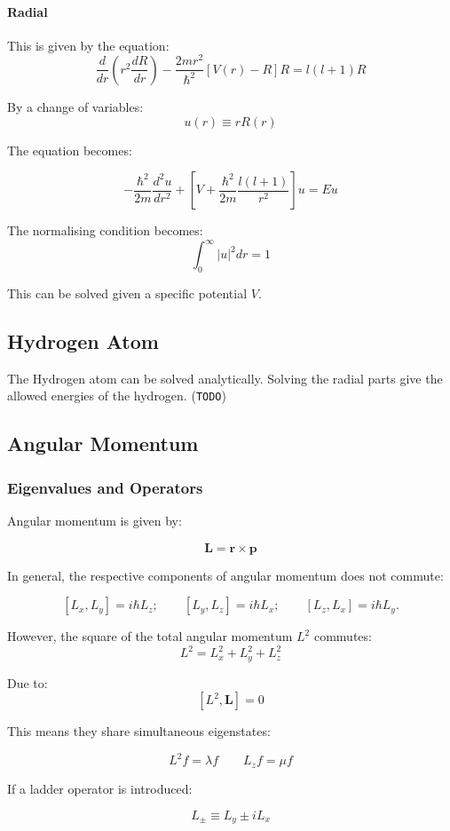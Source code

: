 \documentclass[12pt]{article}
\begin{document}
\paragraph{Radial}

This is given by the equation:
\[\frac{d}{dr}(r^2\frac{dR}{dr}) - \frac{2mr^2}{\hbar^2}[V(r)-R]R = l(l+1)R\]

By a change of variables: 
\[u(r) \equiv rR(r)\]

The equation becomes:

\[-\frac{\hbar^2}{2m}\frac{d^2u}{dr^2} + \left[V + \frac{\hbar^2}{2m}\frac{l(l+1)}{r^2}\right]u=Eu\]

The normalising condition becomes: 
\[\int_0^\infty|u|^2dr = 1\]

This can be solved given a specific potential $V$.

\subsection{Hydrogen Atom}

The Hydrogen atom can be solved analytically. Solving the radial parts give the allowed energies of the hydrogen. (\texttt{TODO})

\subsection{Angular Momentum}
\subsubsection{Eigenvalues and Operators}

Angular momentum is given by:

\[\mathbf{L} = \mathbf{r} \times \mathbf{p}\]

In general, the respective components of angular momentum does not commute:

\[[L_x, L_y] = i\hbar L_z; \qquad [L_y, L_z] = i\hbar L_x; \qquad [L_z,L_x] = i\hbar L_y.\]

However, the square of the total angular momentum $L^2$ commutes:
\[L^2 = L_x^2 + L_y^2 + L_z^2\]

Due to:
\[[L^2, \mathbf{L}] = 0\]

This means they share simultaneous eigenstates:

\[L^2f = \lambda f \qquad L_zf = \mu f\]

If a ladder operator is introduced:

\[L_\pm \equiv L_y \pm iL_x\]
\end{document}
